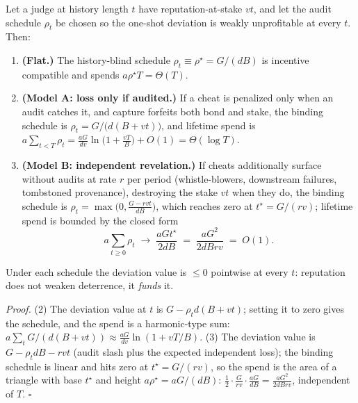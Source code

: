 \documentclass[11pt,a4paper]{article}
\begin{document}
\begin{thebox}
\begin{theorem}[Amortization]\label{thm:amort}
Let a judge at history length $t$ have reputation-at-stake $v t$, and let the audit schedule $\rho_t$ be chosen so the one-shot deviation is weakly unprofitable at every $t$. Then:
\begin{enumerate}[leftmargin=1.6em,itemsep=1pt]
\item \textbf{(Flat.)} The history-blind schedule $\rho_t \equiv \rho^\star = G/(dB)$ is incentive compatible and spends $a\rho^\star T = \Theta(T)$.
\item \textbf{(Model A: loss only if audited.)} If a cheat is penalized only when an audit catches it, and capture forfeits both bond and stake, the binding schedule is
$\rho_t = G / \bigl(d(B + v t)\bigr)$,
and lifetime spend is $a\sum_{t<T}\rho_t = \frac{aG}{dv}\ln\!\bigl(1 + \tfrac{vT}{B}\bigr) + O(1) = \Theta(\log T)$.
\item \textbf{(Model B: independent revelation.)} If cheats additionally surface without audits at rate $r$ per period (whistle-blowers, downstream failures, tombstoned provenance), destroying the stake $vt$ when they do, the binding schedule is
$\rho_t = \max\!\bigl(0, \tfrac{G - r v t}{dB}\bigr)$,
which reaches zero at $t^\star = G/(rv)$; lifetime spend is bounded by the closed form
\[ a\sum_{t\ge 0}\rho_t \;\longrightarrow\; \frac{a G t^\star}{2dB} \;=\; \frac{aG^2}{2dBrv} \;=\; O(1). \]
\end{enumerate}
Under each schedule the deviation value is $\le 0$ pointwise at every $t$: reputation does not weaken deterrence, it \emph{funds} it.
\end{theorem}
\end{thebox}

\emph{Proof.} (2) The deviation value at $t$ is $G - \rho_t d (B + vt)$; setting it to zero gives the schedule, and the spend is a harmonic-type sum: $a\sum_t G/(d(B+vt)) \approx \frac{aG}{dv}\ln(1+vT/B)$. (3) The deviation value is $G - \rho_t d B - r v t$ (audit slash plus the expected independent loss); the binding schedule is linear and hits zero at $t^\star = G/(rv)$, so the spend is the area of a triangle with base $t^\star$ and height $a\rho^\star = aG/(dB)$: $\tfrac12 \cdot \tfrac{G}{rv} \cdot \tfrac{aG}{dB} = \tfrac{aG^2}{2dBrv}$, independent of $T$. \hfill$\square$
\end{document}
